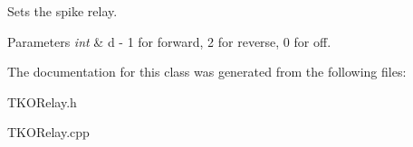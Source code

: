 Sets the spike relay. 


\begin{DoxyParams}{Parameters}
{\em int} & d -\/ 1 for forward, 2 for reverse, 0 for off. \\
\hline
\end{DoxyParams}


The documentation for this class was generated from the following files\-:\begin{DoxyCompactItemize}
\item 
T\-K\-O\-Relay.\-h\item 
T\-K\-O\-Relay.\-cpp\end{DoxyCompactItemize}
